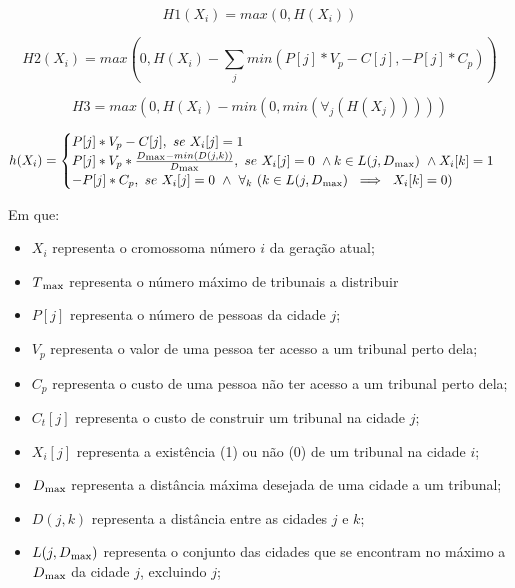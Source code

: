\documentclass[11pt,a4paper,reqno]{article}
\numberwithin{equation}{section}
\begin{document}
\begin{equation} %
    H1(X_i) = max(0, H(X_i))
\end{equation}

\begin{equation} %
    H2(X_i) = max(0, H(X_i) - \sum\limits_{j} min(P[j] * V_p - C[j], -P[j] * C_p))
\end{equation}

\begin{equation}
    H3 = max(0, H(X_i) - min(0, min(\forall _j  (H(X_j)))))
\end{equation}

\begin{equation}    
h(X_i) = \begin{cases} 
    P[j] * V_p - C[j] ,\  se \  X_i[j] = 1 \\
    P[j] * V_p * \frac{D\textsubscript{max} - min(D(j, k))}{D\textsubscript{max}}, \ se \ X_i[j] = 0 \ \wedge k \in L(j, D\textsubscript{max}) \ \wedge X_i[k] = 1 \\
    -P[j] * C_p,\  se \ X_i[j] = 0 \ \wedge \ \forall _k \ (k \in L(j, D\textsubscript{max}) \ \implies \  X_i[k] = 0) \\
	\end{cases}\\
\end{equation}
	
	
Em que:
\begin{itemize}
\item $X_i$ representa o cromossoma número $i$ da geração atual;
\item $T\textsubscript{max}$ representa o número máximo de tribunais a distribuir
\item $P[j]$ representa o número de pessoas da cidade $j$;
\item $V_p$ representa o valor de uma pessoa ter acesso a um tribunal perto dela;
\item $C_p$ representa o custo de uma pessoa não ter acesso a um tribunal perto dela;
\item $C_t[j]$ representa o custo de construir um tribunal na cidade $j$;
\item $X_i[j]$ representa a existência (1) ou não (0) de um tribunal na cidade $i$;
\item $D\textsubscript{max}$ representa a distância máxima desejada de uma cidade a um tribunal;
\item $D(j, k)$ representa a distância entre as cidades $j$ e $k$;
\item $L(j, D\textsubscript{max})$ representa o conjunto das cidades que se encontram no máximo a $D\textsubscript{max}$ da cidade $j$, excluindo $j$;
\end{itemize} 
\end{document}
